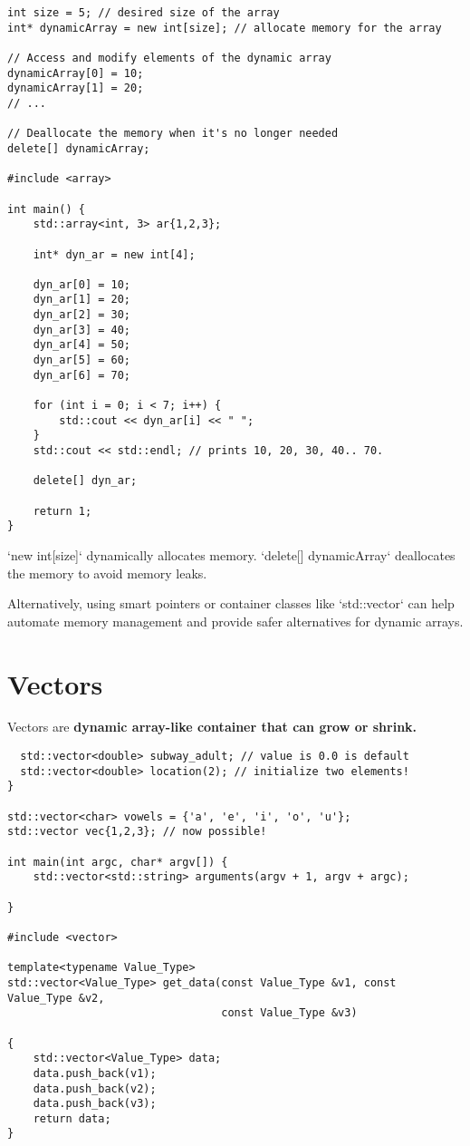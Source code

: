 \documentclass[openany]{report}
\begin{document}
\begin{verbatim}
int size = 5; // desired size of the array
int* dynamicArray = new int[size]; // allocate memory for the array

// Access and modify elements of the dynamic array
dynamicArray[0] = 10;
dynamicArray[1] = 20;
// ...

// Deallocate the memory when it's no longer needed
delete[] dynamicArray;

#include <array>

int main() {
    std::array<int, 3> ar{1,2,3};

    int* dyn_ar = new int[4];

    dyn_ar[0] = 10;
    dyn_ar[1] = 20;
    dyn_ar[2] = 30;
    dyn_ar[3] = 40;
    dyn_ar[4] = 50;
    dyn_ar[5] = 60;
    dyn_ar[6] = 70;

    for (int i = 0; i < 7; i++) {
        std::cout << dyn_ar[i] << " ";
    }
    std::cout << std::endl; // prints 10, 20, 30, 40.. 70.

    delete[] dyn_ar;

    return 1;
}

\end{verbatim}

`new int[size]` dynamically allocates memory. 
`delete[] dynamicArray` deallocates the memory to avoid memory leaks.

Alternatively, using smart pointers or container classes like `std::vector` can help automate memory management
and provide safer alternatives for dynamic arrays.

\section{Vectors}

Vectors are \textbf{dynamic array-like container that can grow or shrink.}

\begin{verbatim}
  std::vector<double> subway_adult; // value is 0.0 is default
  std::vector<double> location(2); // initialize two elements! 
}

std::vector<char> vowels = {'a', 'e', 'i', 'o', 'u'};
std::vector vec{1,2,3}; // now possible! 

int main(int argc, char* argv[]) {
    std::vector<std::string> arguments(argv + 1, argv + argc);

}

#include <vector>

template<typename Value_Type>
std::vector<Value_Type> get_data(const Value_Type &v1, const Value_Type &v2,
                                 const Value_Type &v3)

{
    std::vector<Value_Type> data;
    data.push_back(v1);
    data.push_back(v2);
    data.push_back(v3);
    return data;
}
\end{verbatim}
\end{document}
